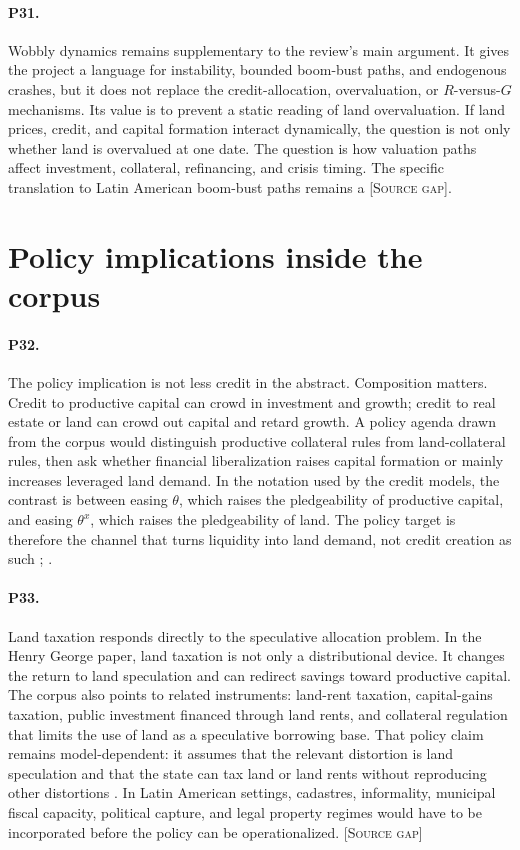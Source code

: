 \documentclass[11pt]{article}
\newcommand{\sourcegap}{\textsc{[Source gap]}}
\begin{document}
\paragraph{P31.} Wobbly dynamics remains supplementary to the review's main argument. It gives the project a language for instability, bounded boom-bust paths, and endogenous crashes, but it does not replace the credit-allocation, overvaluation, or \(R\)-versus-\(G\) mechanisms. Its value is to prevent a static reading of land overvaluation. If land prices, credit, and capital formation interact dynamically, the question is not only whether land is overvalued at one date. The question is how valuation paths affect investment, collateral, refinancing, and crisis timing. The specific translation to Latin American boom-bust paths remains a \sourcegap{}.

\section{Policy implications inside the corpus}

\paragraph{P32.} The policy implication is not less credit in the abstract. Composition matters. Credit to productive capital can crowd in investment and growth; credit to real estate or land can crowd out capital and retard growth. A policy agenda drawn from the corpus would distinguish productive collateral rules from land-collateral rules, then ask whether financial liberalization raises capital formation or mainly increases leveraged land demand. In the notation used by the credit models, the contrast is between easing \(\theta\), which raises the pledgeability of productive capital, and easing \(\theta^x\), which raises the pledgeability of land. The policy target is therefore the channel that turns liquidity into land demand, not credit creation as such \citep[pp.~1, 15, 33, 38]{hiranoStiglitz2024CreditLandGrowth}; \citep[p.~1]{hiranoStiglitz2025LowInterestPolicy}.

\paragraph{P33.} Land taxation responds directly to the speculative allocation problem. In the Henry George paper, land taxation is not only a distributional device. It changes the return to land speculation and can redirect savings toward productive capital. The corpus also points to related instruments: land-rent taxation, capital-gains taxation, public investment financed through land rents, and collateral regulation that limits the use of land as a speculative borrowing base. That policy claim remains model-dependent: it assumes that the relevant distortion is land speculation and that the state can tax land or land rents without reproducing other distortions \citep[pp.~327--328, 335, 344]{hiranoStiglitz2025HenryGeorge}. In Latin American settings, cadastres, informality, municipal fiscal capacity, political capture, and legal property regimes would have to be incorporated before the policy can be operationalized. \sourcegap{}
\end{document}

